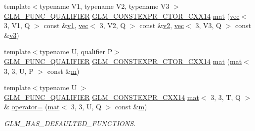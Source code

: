\begin{DoxyCompactItemize}
{\footnotesize template$<$typename V1, typename V2, typename V3 $>$ }\\\mbox{\hyperlink{setup_8hpp_a33fdea6f91c5f834105f7415e2a64407}{G\+L\+M\+\_\+\+F\+U\+N\+C\+\_\+\+Q\+U\+A\+L\+I\+F\+I\+ER}} \mbox{\hyperlink{setup_8hpp_a0900f9145e68bf6061b6f5e7be3fa751}{G\+L\+M\+\_\+\+C\+O\+N\+S\+T\+E\+X\+P\+R\+\_\+\+C\+T\+O\+R\+\_\+\+C\+X\+X14}} \mbox{\hyperlink{structglm_1_1mat_3_013_00_013_00_01_t_00_01_q_01_4_a4795e853feaed2593cdee9e041da1f58}{mat}} (\mbox{\hyperlink{structglm_1_1vec}{vec}}$<$ 3, V1, Q $>$ const \&\mbox{\hyperlink{_s_d_l__opengl__glext_8h_a435c176a02c061b43e19bdf7c86cceae}{v1}}, \mbox{\hyperlink{structglm_1_1vec}{vec}}$<$ 3, V2, Q $>$ const \&\mbox{\hyperlink{_s_d_l__opengl__glext_8h_a0928f6d0f0f794ba000a21dfae422136}{v2}}, \mbox{\hyperlink{structglm_1_1vec}{vec}}$<$ 3, V3, Q $>$ const \&\mbox{\hyperlink{_s_d_l__opengl__glext_8h_acc806b31cbf466ceba6555983d8b814d}{v3}})
\item 
{\footnotesize template$<$typename U, qualifier P$>$ }\\\mbox{\hyperlink{setup_8hpp_a33fdea6f91c5f834105f7415e2a64407}{G\+L\+M\+\_\+\+F\+U\+N\+C\+\_\+\+Q\+U\+A\+L\+I\+F\+I\+ER}} \mbox{\hyperlink{setup_8hpp_a0900f9145e68bf6061b6f5e7be3fa751}{G\+L\+M\+\_\+\+C\+O\+N\+S\+T\+E\+X\+P\+R\+\_\+\+C\+T\+O\+R\+\_\+\+C\+X\+X14}} \mbox{\hyperlink{structglm_1_1mat_3_013_00_013_00_01_t_00_01_q_01_4_ad2ae09a7a8a55aa735691eaf3dad3e0f}{mat}} (\mbox{\hyperlink{structglm_1_1mat}{mat}}$<$ 3, 3, U, P $>$ const \&\mbox{\hyperlink{_s_d_l__opengl__glext_8h_af593500c283bf1a787a6f947f503a5c2}{m}})
\item 
{\footnotesize template$<$typename U $>$ }\\\mbox{\hyperlink{setup_8hpp_a33fdea6f91c5f834105f7415e2a64407}{G\+L\+M\+\_\+\+F\+U\+N\+C\+\_\+\+Q\+U\+A\+L\+I\+F\+I\+ER}} \mbox{\hyperlink{setup_8hpp_a4dd12abf5e1164bc57f3a34671d03844}{G\+L\+M\+\_\+\+C\+O\+N\+S\+T\+E\+X\+P\+R\+\_\+\+C\+X\+X14}} \mbox{\hyperlink{structglm_1_1mat}{mat}}$<$ 3, 3, T, Q $>$ \& \mbox{\hyperlink{structglm_1_1mat_3_013_00_013_00_01_t_00_01_q_01_4_aec5bce9abbb6bbe0b55fbec3b8c01098}{operator=}} (\mbox{\hyperlink{structglm_1_1mat}{mat}}$<$ 3, 3, U, Q $>$ const \&\mbox{\hyperlink{_s_d_l__opengl__glext_8h_af593500c283bf1a787a6f947f503a5c2}{m}})
\begin{DoxyCompactList}\small\item\em G\+L\+M\+\_\+\+H\+A\+S\+\_\+\+D\+E\+F\+A\+U\+L\+T\+E\+D\+\_\+\+F\+U\+N\+C\+T\+I\+O\+NS. \end{DoxyCompactList}\item 

\end{DoxyCompactItemize}
